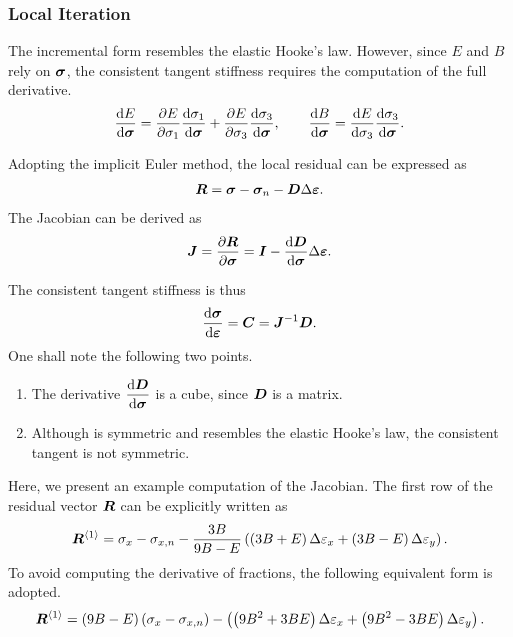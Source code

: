 \subsubsection{Local Iteration}
The incremental form  resembles the elastic Hooke's law.
However, since $E$ and $B$ rely on $\bm{\sigma}$, the consistent tangent stiffness requires the computation of the full derivative.
\begin{gather}
\dfrac{\mathrm{d}E}{\mathrm{d}\bm{\sigma}}=\dfrac{\partial{E}}{\partial{\sigma_1}}\dfrac{\mathrm{d}\sigma_1}{\mathrm{d}\bm{\sigma}}+\dfrac{\partial{E}}{\partial{\sigma_3}}\dfrac{\mathrm{d}\sigma_3}{\mathrm{d}\bm{\sigma}},\qquad
\dfrac{\mathrm{d}B}{\mathrm{d}\bm{\sigma}}=\dfrac{\mathrm{d}E}{\mathrm{d}\sigma_3}\dfrac{\mathrm{d}\sigma_3}{\mathrm{d}\bm{\sigma}}.
\end{gather}

Adopting the implicit Euler method, the local residual can be expressed as
\begin{gather}
\bm{R}=\bm{\sigma}-\bm{\sigma}_n-\bm{D}\Delta\bm{\varepsilon}.
\end{gather}
The Jacobian can be derived as
\begin{gather}
\bm{J}=\dfrac{\partial{\bm{R}}}{\partial{\bm{\sigma}}}=\bm{I}-\dfrac{\mathrm{d}\bm{D}}{\mathrm{d}\bm{\sigma}}\Delta\bm{\varepsilon}.
\end{gather}

The consistent tangent stiffness is thus
\begin{gather}
\dfrac{\mathrm{d}\bm{\sigma}}{\mathrm{d}\bm{\varepsilon}}=\bm{C}=\bm{J}^{-1}\bm{D}.
\end{gather}
One shall note the following two points.
\begin{enumerate}
\item The derivative $\dfrac{\mathrm{d}\bm{D}}{\mathrm{d}\bm{\sigma}}$ is a cube, since $\bm{D}$ is a matrix.
\item Although  is symmetric and resembles the elastic Hooke's law, the consistent tangent is not symmetric.
\end{enumerate}

Here, we present an example computation of the Jacobian. The first row of the residual vector $\bm{R}$ can be explicitly written as
\begin{gather}
\bm{R}^{\left\langle1\right\rangle}=\sigma_x-\sigma_{x,n}-\dfrac{3B}{9B-E}\left(\left(3B+E\right)\Delta\varepsilon_x+\left(3B-E\right)\Delta\varepsilon_y\right).
\end{gather}
To avoid computing the derivative of fractions, the following equivalent form is adopted.
\begin{gather}
\bm{R}^{\left\langle1\right\rangle}=\left(9B-E\right)\left(\sigma_x-\sigma_{x,n}\right)-\left(\left(9B^2+3BE\right)\Delta\varepsilon_x+\left(9B^2-3BE\right)\Delta\varepsilon_y\right).
\end{gather}

